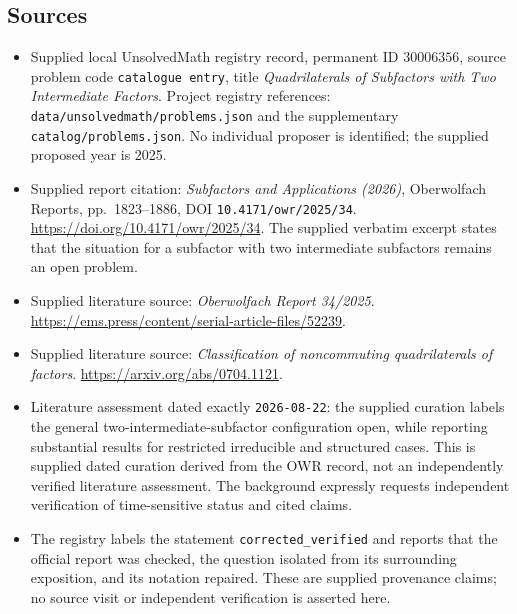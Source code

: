 \documentclass[11pt]{article}
\begin{document}
\subsection{Sources}
\begin{itemize}
\item Supplied local UnsolvedMath registry record, permanent ID \(30006356\), source problem code \texttt{catalogue entry}, title \emph{Quadrilaterals of Subfactors with Two Intermediate Factors}. Project registry references: \texttt{data/unsolvedmath/problems.json} and the supplementary \texttt{catalog/problems.json}. No individual proposer is identified; the supplied proposed year is 2025.
\item Supplied report citation: \emph{Subfactors and Applications (2026)}, Oberwolfach Reports, pp.\ 1823--1886, DOI \texttt{10.4171/owr/2025/34}. \url{https://doi.org/10.4171/owr/2025/34}. The supplied verbatim excerpt states that the situation for a subfactor with two intermediate subfactors remains an open problem.
\item Supplied literature source: \emph{Oberwolfach Report 34/2025}. \url{https://ems.press/content/serial-article-files/52239}.
\item Supplied literature source: \emph{Classification of noncommuting quadrilaterals of factors}. \url{https://arxiv.org/abs/0704.1121}.
\item Literature assessment dated exactly \texttt{2026-08-22}: the supplied curation labels the general two-intermediate-subfactor configuration open, while reporting substantial results for restricted irreducible and structured cases. This is supplied dated curation derived from the OWR record, not an independently verified literature assessment. The background expressly requests independent verification of time-sensitive status and cited claims.
\item The registry labels the statement \texttt{corrected\_verified} and reports that the official report was checked, the question isolated from its surrounding exposition, and its notation repaired. These are supplied provenance claims; no source visit or independent verification is asserted here.
\end{itemize}
\end{document}

